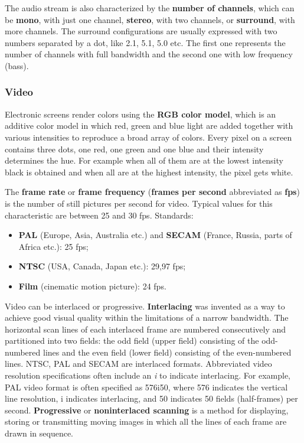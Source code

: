 The audio stream is also characterized by the \textbf{number of channels},
which can be \textbf{mono}, with just one channel, \textbf{stereo}, with two
channels, or \textbf{surround}, with more channels. The surround
configurations are usually expressed with two numbers separated by a dot, like
2.1, 5.1, 5.0 etc.  The first one represents the number of channels with full
bandwidth and the second one with low frequency (bass).

\subsubsection{Video}

Electronic screens render colors using the \textbf{RGB color model}, which is
an additive color model in which red, green and blue light are added together
with various intensities to reproduce a broad array of colors.  Every pixel on
a screen contains three dots, one red, one green and one blue and their
intensity determines the hue. For example when all of them are at the lowest
intensity black is obtained and when all are at the highest intensity, the
pixel gets white.

The \textbf{frame rate} or \textbf{frame frequency} (\textbf{frames per
second} abbreviated as \textbf{fps}) is the number of still pictures per
second for video. Typical values for this characteristic are between 25 and 30
fps. Standards:
\begin{itemize}
  \item \textbf{PAL} (Europe, Asia, Australia etc.) and \textbf{SECAM}
  (France, Russia, parts of Africa etc.): 25 fps;
  \item \textbf{NTSC} (USA, Canada, Japan etc.): 29,97 fps;
  \item \textbf{Film} (cinematic motion picture): 24 fps.
\end{itemize}

Video can be interlaced or progressive. \textbf{Interlacing} was invented as a
way to achieve good visual quality within the limitations of a narrow
bandwidth. The horizontal scan lines of each interlaced frame are numbered
consecutively and partitioned into two fields: the odd field (upper field)
consisting of the odd-numbered lines and the even field (lower field)
consisting of the even-numbered lines. NTSC, PAL and SECAM are interlaced
formats. Abbreviated video resolution specifications often include an
\textit{i} to indicate interlacing. For example, PAL video format is often
specified as 576i50, where 576 indicates the vertical line resolution, i
indicates interlacing, and 50 indicates 50 fields (half-frames) per second.
\textbf{Progressive} or \textbf{noninterlaced scanning} is a method for
displaying, storing or transmitting moving images in which all the lines of
each frame are drawn in sequence.

